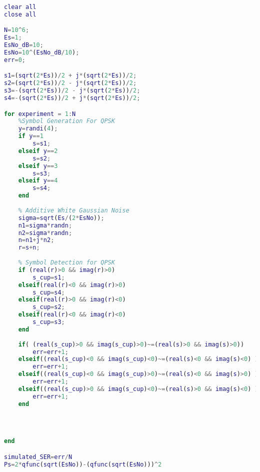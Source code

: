 \documentclass{article}
\begin{document}
\begin{otherlanguage}{english}
\begin{lstlisting}[language=MATLAB, caption= SER In QPSK Modulation ]
%PERKAS DIMITRIOS 4156
clear all
close all

N=10^6;
Es=1;
EsNo_dB=10;
EsNo=10^(EsNo_dB/10);
err=0;

s1=(sqrt(2*Es))/2 + j*(sqrt(2*Es))/2;
s2=(sqrt(2*Es))/2 - j*(sqrt(2*Es))/2;
s3=-(sqrt(2*Es))/2 - j*(sqrt(2*Es))/2;
s4=-(sqrt(2*Es))/2 + j*(sqrt(2*Es))/2;

for experiment = 1:N
    %Symbol Generation For QPSK
    y=randi(4);
    if y==1
        s=s1;
    elseif y==2
        s=s2;
    elseif y==3
        s=s3;
    elseif y==4
        s=s4;
    end
    
    % Additive White Gaussian Noise     
    sigma=sqrt(Es/(2*EsNo));
    n1=sigma*randn;
    n2=sigma*randn;
    n=n1+j*n2;
    r=s+n;
    
    % Symbol Detection for QPSK
    if (real(r)>0 && imag(r)>0)
        s_cup=s1;
    elseif(real(r)<0 && imag(r)>0)
        s_cup=s4;
    elseif(real(r)>0 && imag(r)<0)
        s_cup=s2;
    elseif(real(r)<0 && imag(r)<0)
        s_cup=s3;
    end
    
    if( (real(s_cup)>0 && imag(s_cup)>0)~=(real(s)>0 && imag(s)>0))
        err=err+1;
    elseif((real(s_cup)<0 && imag(s_cup)<0)~=(real(s)<0 && imag(s)<0) )
        err=err+1;
    elseif((real(s_cup)<0 && imag(s_cup)>0)~=(real(s)<0 && imag(s)>0) )
        err=err+1;
    elseif((real(s_cup)>0 && imag(s_cup)<0)~=(real(s)>0 && imag(s)<0) )
        err=err+1;
    end
    
    
    
       
end

simulated_SER=err/N
Ps=2*qfunc(sqrt(EsNo))-(qfunc(sqrt(EsNo)))^2



\end{lstlisting}
\end{otherlanguage}




\end{document}
